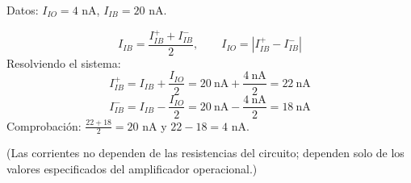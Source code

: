 \documentclass[11pt]{article}
\begin{document}
Datos: $I_{IO}=4$ nA,\; $I_{IB}=20$ nA.

\[
I_{IB} = \frac{I_{IB}^+ + I_{IB}^-}{2},\qquad I_{IO} = \left|I_{IB}^+ - I_{IB}^-\right|
\]
Resolviendo el sistema:
\[
I_{IB}^+ = I_{IB} + \frac{I_{IO}}{2} = 20\ \mathrm{nA} + \frac{4\ \mathrm{nA}}{2} = \boxed{22\ \mathrm{nA}}
\]
\[
I_{IB}^- = I_{IB} - \frac{I_{IO}}{2} = 20\ \mathrm{nA} - \frac{4\ \mathrm{nA}}{2} = \boxed{18\ \mathrm{nA}}
\]
Comprobación: $\frac{22+18}{2}=20$ nA y $22-18=4$ nA. \checkmark

(Las corrientes no dependen de las resistencias del circuito; dependen solo de los
valores especificados del amplificador operacional.)
\end{document}
